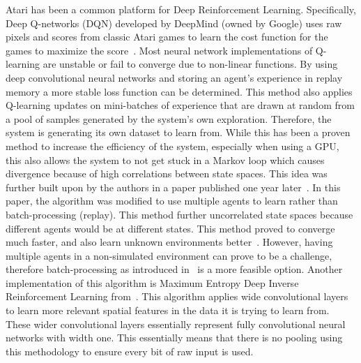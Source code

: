 \documentclass[12pt,american]{report}
\begin{document}
	Atari has been a common platform for Deep Reinforcement Learning. Specifically, Deep Q-networks (DQN) developed by DeepMind (owned by Google) uses raw pixels and scores from classic Atari games to learn the cost function for the games to maximize the score~\cite{mnih2015human}. Most neural network implementations of Q-learning are unstable or fail to converge due to non-linear functions. By using deep convolutional neural networks and storing an agent's experience in replay memory a more stable loss function can be determined.   This method also applies Q-learning updates on mini-batches of experience that are drawn at random from a pool of samples generated by the system's own exploration. Therefore, the system is generating its own dataset to learn from. While this has been a proven method to increase the efficiency of the system, especially when using a GPU, this also allows the system to not get stuck in a Markov loop which causes divergence because of high correlations between state spaces.  This idea was further built upon by the authors in a paper published one year later~\cite{mnih2016asynchronous}. In this paper, the algorithm was modified to use multiple agents to learn rather than batch-processing (replay). This method further uncorrelated state spaces because different agents would be at different states. This method proved to converge much faster, and also learn unknown environments better~\cite{mnih2016asynchronous}. However, having multiple agents in a non-simulated environment can prove to be a challenge, therefore batch-processing as introduced in~\cite{mnih2015human} is a more feasible option. Another implementation of this algorithm is Maximum Entropy Deep Inverse Reinforcement Learning from~\cite{wulfmeier2015maximum}. This algorithm applies wide convolutional layers to learn more relevant spatial features in the data it is trying to learn from. These wider convolutional layers essentially represent fully convolutional neural networks with width one. This essentially means that there is no pooling using this methodology to ensure every bit of raw input is used. 
	
\end{document}
